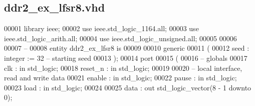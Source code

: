 \subsection{ddr2\+\_\+ex\+\_\+lfsr8.\+vhd}
\label{ddr2__ex__lfsr8_8vhd_source}

\begin{DoxyCode}
00001 \textcolor{vhdlkeyword}{library }\textcolor{keywordflow}{ieee};
00002 \textcolor{vhdlkeyword}{use }ieee.std\_logic\_1164.\textcolor{keywordflow}{all};
00003 \textcolor{vhdlkeyword}{use }ieee.std\_logic\_arith.\textcolor{keywordflow}{all};
00004 \textcolor{vhdlkeyword}{use }ieee.std\_logic\_unsigned.\textcolor{keywordflow}{all};
00005 
00006 
00007 \textcolor{keyword}{--}
00008 \textcolor{keywordflow}{entity }ddr2_ex_lfsr8 \textcolor{keywordflow}{is}
00009 
00010     \textcolor{keywordflow}{generic}
00011     \textcolor{vhdlchar}{(}
00012         \textcolor{vhdlchar}{seed}                 \textcolor{vhdlchar}{:} \textcolor{comment}{integer} \textcolor{vhdlchar}{:=} \textcolor{vhdllogic}{}\textcolor{vhdllogic}{32}\textcolor{keyword}{        -- starting seed}
00013     \textcolor{vhdlchar}{)};
00014     \textcolor{keywordflow}{port}
00015     \textcolor{vhdlchar}{(}
00016 \textcolor{keyword}{        -- globals}
00017         \textcolor{vhdlchar}{clk}                 \textcolor{vhdlchar}{:} \textcolor{keywordflow}{in}   \textcolor{comment}{std\_logic};
00018         \textcolor{vhdlchar}{reset_n}             \textcolor{vhdlchar}{:} \textcolor{keywordflow}{in}   \textcolor{comment}{std\_logic};
00019 
00020 \textcolor{keyword}{        -- local interface, read and write data}
00021         enable               : \textcolor{keywordflow}{in}   \textcolor{comment}{std\_logic};
00022         \textcolor{vhdlchar}{pause}                \textcolor{vhdlchar}{:} \textcolor{keywordflow}{in}   \textcolor{comment}{std\_logic};
00023         \textcolor{vhdlchar}{load}                 \textcolor{vhdlchar}{:} \textcolor{keywordflow}{in}   \textcolor{comment}{std\_logic};
00024 
00025         \textcolor{vhdlchar}{data}                 \textcolor{vhdlchar}{:} \textcolor{keywordflow}{out}  \textcolor{comment}{std\_logic\_vector}\textcolor{vhdlchar}{(}\textcolor{vhdllogic}{}\textcolor{vhdllogic}{8} \textcolor{vhdlchar}{-} \textcolor{vhdllogic}{}\textcolor{vhdllogic}{1} \textcolor{keywordflow}{downto} \textcolor{vhdllogic}{}\textcolor{vhdllogic}{0}\textcolor{vhdlchar}{)};

\end{DoxyCode}
